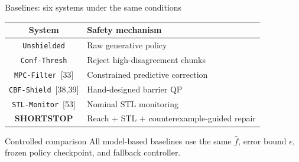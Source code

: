 \documentclass[aspectratio=169]{beamer}
\begin{document}
\begin{frame}[t,shrink=8]{Baselines: six systems under the same conditions}

\begin{center}

\begin{tabular}{c|l}
\textbf{System} & \textbf{Safety mechanism} \\ \hline

\texttt{Unshielded}
& Raw generative policy
\\[3pt]

\texttt{Conf-Thresh}
& Reject high-disagreement chunks
\\[3pt]

\texttt{MPC-Filter}~[33]
& Constrained predictive correction
\\[3pt]

\texttt{CBF-Shield}~[38,39]
& Hand-designed barrier QP
\\[3pt]

\texttt{STL-Monitor}~[53]
& Nominal STL monitoring
\\[3pt]

\textbf{SHORTSTOP}
& Reach + STL + counterexample-guided repair
\end{tabular}

\end{center}

\vspace{7pt}

\begin{alertblock}{Controlled comparison}
All model-based baselines use the same
$\hat f$, error bound $\epsilon$, frozen policy checkpoint,
and fallback controller.
\end{alertblock}

\end{frame}
\end{document}
